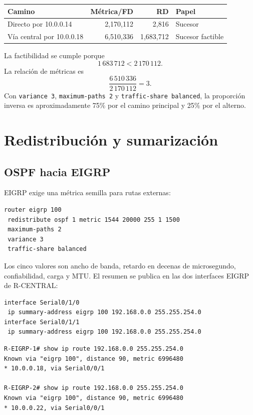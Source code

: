 \documentclass[10pt]{article}
\begin{document}
\begin{center}
\begin{tabular}{l r r l}
\toprule
Camino & Métrica/FD & RD & Papel\\
\midrule
Directo por 10.0.0.14 & 2,170,112 & 2,816 & Sucesor\\
Vía central por 10.0.0.18 & 6,510,336 & 1,683,712 & Sucesor factible\\
\bottomrule
\end{tabular}
\end{center}

La factibilidad se cumple porque
\[
1\,683\,712<2\,170\,112.
\]
La relación de métricas es
\[
\frac{6\,510\,336}{2\,170\,112}=3.
\]
Con \texttt{variance 3}, \texttt{maximum-paths 2} y \texttt{traffic-share balanced}, la proporción inversa es aproximadamente 75\% por el camino principal y 25\% por el alterno.

\section{Redistribución y sumarización}

\subsection{OSPF hacia EIGRP}
EIGRP exige una métrica semilla para rutas externas:
\begin{verbatim}
router eigrp 100
 redistribute ospf 1 metric 1544 20000 255 1 1500
 maximum-paths 2
 variance 3
 traffic-share balanced
\end{verbatim}
Los cinco valores son ancho de banda, retardo en decenas de microsegundo, confiabilidad, carga y MTU. El resumen se publica en las dos interfaces EIGRP de R-CENTRAL:
\begin{verbatim}
interface Serial0/1/0
 ip summary-address eigrp 100 192.168.0.0 255.255.254.0
interface Serial0/1/1
 ip summary-address eigrp 100 192.168.0.0 255.255.254.0
\end{verbatim}

\begin{evidencia}
\begin{verbatim}
R-EIGRP-1# show ip route 192.168.0.0 255.255.254.0
Known via "eigrp 100", distance 90, metric 6996480
* 10.0.0.18, via Serial0/0/1

R-EIGRP-2# show ip route 192.168.0.0 255.255.254.0
Known via "eigrp 100", distance 90, metric 6996480
* 10.0.0.22, via Serial0/0/1
\end{verbatim}
\end{evidencia}
\end{document}
